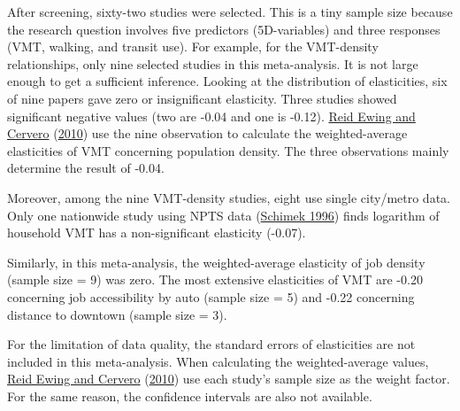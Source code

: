 \documentclass[
  12pt,
]{article}
\begin{document}
After screening, sixty-two studies were selected. This is a tiny sample size because the research question involves five predictors (5D-variables) and three responses (VMT, walking, and transit use). For example, for the VMT-density relationships, only nine selected studies in this meta-analysis. It is not large enough to get a sufficient inference. Looking at the distribution of elasticities, six of nine papers gave zero or insignificant elasticity. Three studies showed significant negative values (two are -0.04 and one is -0.12). \protect\hyperlink{ref-ewingTravelBuiltEnvironment2010}{Reid Ewing and Cervero} (\protect\hyperlink{ref-ewingTravelBuiltEnvironment2010}{2010}) use the nine observation to calculate the weighted-average elasticities of VMT concerning population density. The three observations mainly determine the result of -0.04.

Moreover, among the nine VMT-density studies, eight use single city/metro data. Only one nationwide study using NPTS data (\protect\hyperlink{ref-schimekHouseholdMotorVehicle1996}{Schimek 1996}) finds logarithm of household VMT has a non-significant elasticity (-0.07).

Similarly, in this meta-analysis, the weighted-average elasticity of job density (sample size = 9) was zero. The most extensive elasticities of VMT are -0.20 concerning job accessibility by auto (sample size = 5) and -0.22 concerning distance to downtown (sample size = 3).

For the limitation of data quality, the standard errors of elasticities are not included in this meta-analysis. When calculating the weighted-average values, \protect\hyperlink{ref-ewingTravelBuiltEnvironment2010}{Reid Ewing and Cervero} (\protect\hyperlink{ref-ewingTravelBuiltEnvironment2010}{2010}) use each study's sample size as the weight factor. For the same reason, the confidence intervals are also not available.
\end{document}
